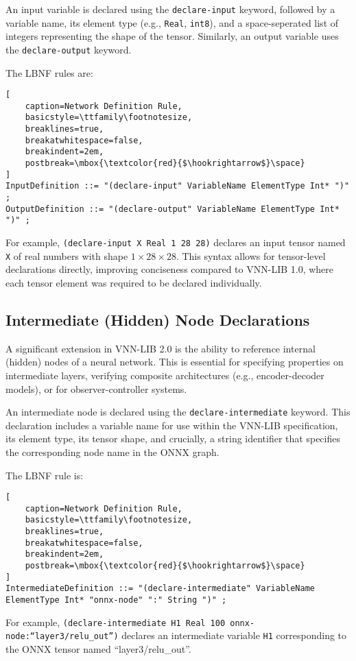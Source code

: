 An input variable is declared using the \texttt{declare-input} keyword, followed by a variable name, its element type (e.g., \texttt{Real}, \texttt{int8}), and a space-seperated list of integers 
representing the shape of the tensor. Similarly, an output variable uses the \texttt{declare-output} keyword.

The LBNF rules are:
\begin{lstlisting}[
    caption=Network Definition Rule, 
    basicstyle=\ttfamily\footnotesize,
    breaklines=true,               
    breakatwhitespace=false,       
    breakindent=2em,                
    postbreak=\mbox{\textcolor{red}{$\hookrightarrow$}\space} 
]
InputDefinition ::= "(declare-input" VariableName ElementType Int* ")" ;
OutputDefinition ::= "(declare-output" VariableName ElementType Int* ")" ;
\end{lstlisting}
For example, \texttt{(declare-input X Real 1 28 28)} declares an input tensor named \texttt{X} of real numbers with shape $1 \times 28 \times 28$. This syntax allows for tensor-level 
declarations directly, improving conciseness compared to VNN-LIB 1.0, where each tensor element was required to be declared individually.


\subsection{Intermediate (Hidden) Node Declarations}
A significant extension in VNN-LIB 2.0 is the ability to reference internal (hidden) nodes of a neural network. This is essential for specifying properties on intermediate 
layers, verifying composite architectures (e.g., encoder-decoder models), or for observer-controller systems.

An intermediate node is declared using the \texttt{declare-intermediate} keyword. This declaration includes a variable name for use within the VNN-LIB specification, 
its element type, its tensor shape, and crucially, a string identifier that specifies the corresponding node name in the ONNX graph.

The LBNF rule is:
\begin{lstlisting}[
    caption=Network Definition Rule, 
    basicstyle=\ttfamily\footnotesize,
    breaklines=true,               
    breakatwhitespace=false,       
    breakindent=2em,                
    postbreak=\mbox{\textcolor{red}{$\hookrightarrow$}\space} 
]
IntermediateDefinition ::= "(declare-intermediate" VariableName ElementType Int* "onnx-node" ":" String ")" ;
\end{lstlisting}
For example, \texttt{(declare-intermediate H1 Real 100 onnx-node:``layer3/relu\_out'')} declares an intermediate variable \texttt{H1} corresponding to the 
ONNX tensor named ``layer3/relu\_out''.

